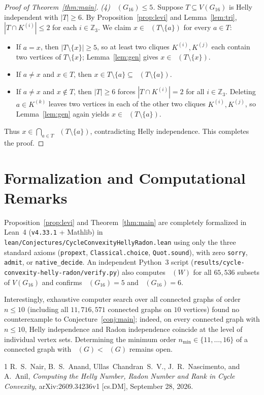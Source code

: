 \documentclass[11pt,a4paper]{article}
\DeclareMathOperator{\hl}{hl_{cc}}
\DeclareMathOperator{\rd}{rd_{cc}}
\DeclareMathOperator{\Hull}{Hull_{cc}}
\begin{document}
\begin{proof}[Proof of Theorem~\ref{thm:main}]
\emph{(4) $\hl(G_{16}) \le 5$.} Suppose $T \subseteq V(G_{16})$ is Helly independent with $|T| \ge 6$. By Proposition~\ref{prop:levi} and Lemma~\ref{lem:tri}, $|T \cap K^{(i)}| \le 2$ for each $i \in \mathbb{Z}_3$. We claim $x \in \Hull(T \setminus \{a\})$ for every $a \in T$:
\begin{itemize}
\item If $a = x$, then $|T \setminus \{x\}| \ge 5$, so at least two cliques $K^{(i)}, K^{(j)}$ each contain two vertices of $T \setminus \{x\}$; Lemma~\ref{lem:gen} gives $x \in \Hull(T \setminus \{x\})$.
\item If $a \neq x$ and $x \in T$, then $x \in T \setminus \{a\} \subseteq \Hull(T \setminus \{a\})$.
\item If $a \neq x$ and $x \notin T$, then $|T| \ge 6$ forces $|T \cap K^{(i)}| = 2$ for all $i \in \mathbb{Z}_3$. Deleting $a \in K^{(k)}$ leaves two vertices in each of the other two cliques $K^{(i)}, K^{(j)}$, so Lemma~\ref{lem:gen} again yields $x \in \Hull(T \setminus \{a\})$.
\end{itemize}
Thus $x \in \bigcap_{a \in T} \Hull(T \setminus \{a\})$, contradicting Helly independence. This completes the proof.
\end{proof}

\section{Formalization and Computational Remarks}

Proposition~\ref{prop:levi} and Theorem~\ref{thm:main} are completely formalized in Lean~4 (\texttt{v4.33.1} + Mathlib) in \texttt{lean/Conjectures/CycleConvexityHellyRadon.lean} using only the three standard axioms (\texttt{propext}, \texttt{Classical.choice}, \texttt{Quot.sound}), with zero \texttt{sorry}, \texttt{admit}, or \texttt{native\_decide}. An independent Python~3 script (\texttt{results/cycle-convexity-helly-radon/verify.py}) also computes $\Hull(W)$ for all $65{,}536$ subsets of $V(G_{16})$ and confirms $\hl(G_{16}) = 5$ and $\rd(G_{16}) = 6$.

Interestingly, exhaustive computer search over all connected graphs of order $n \le 10$ (including all $11{,}716{,}571$ connected graphs on $10$ vertices) found no counterexample to Conjecture~\ref{conj:main}; indeed, on every connected graph with $n \le 10$, Helly independence and Radon independence coincide at the level of individual vertex sets. Determining the minimum order $n_{\min} \in \{11, \dots, 16\}$ of a connected graph with $\hl(G) < \rd(G)$ remains open.

\begin{thebibliography}{1}
R.~S.~Nair, B.~S.~Anand, Ullas~Chandran~S.~V., J.~R.~Nascimento, and A.~Anil,
\emph{Computing the Helly Number, Radon Number and Rank in Cycle Convexity},
arXiv:2609.34236v1 [cs.DM], September 28, 2026.
\end{thebibliography}
\end{document}
